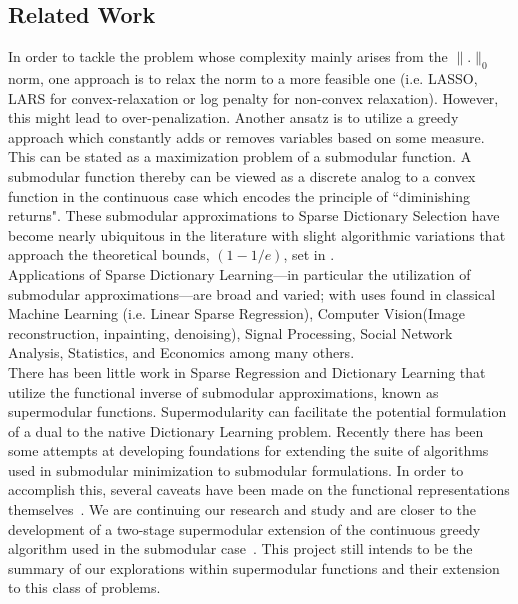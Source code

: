 \documentclass{article}
\begin{document}
\subsection{Related Work}
In order to tackle the problem whose complexity mainly arises from the $\| .\|_0$ norm, one approach is to relax the norm to a more feasible one (i.e. LASSO, LARS for convex-relaxation or log penalty for non-convex relaxation). However, this might lead to over-penalization\cite{nonconvexrelax}. Another ansatz is to utilize a greedy approach which constantly adds or removes variables based on some measure\cite{submod_spectral}.  This can be stated as a maximization problem of a submodular function. A submodular function thereby can be viewed as a discrete analog to a convex function in the continuous case\cite{submod_sparsecoding} which encodes the principle of ``diminishing returns". These submodular approximations to Sparse Dictionary Selection have become nearly ubiquitous in the literature with slight algorithmic variations that approach the theoretical bounds, $(1 - 1/e)$, set in \cite{Krause05near-optimalnonmyopic}.
\\

\noindent Applications of Sparse Dictionary Learning---in particular the utilization of submodular approximations---are broad and varied; with uses found in classical Machine Learning (i.e. Linear Sparse Regression), Computer Vision(Image reconstruction, inpainting, denoising), Signal Processing\cite{nonconvexrelax}\cite{submod_sparsecoding}, Social Network Analysis, Statistics\cite{rIBP}, and Economics\cite{utilityWelfare} among many others. 
\\

\noindent There has been little work in Sparse Regression and Dictionary Learning that utilize the functional inverse of submodular approximations, known as supermodular functions. Supermodularity can facilitate the potential formulation of a dual to the native Dictionary Learning problem. Recently there has been some attempts at developing foundations for extending the suite of algorithms used in submodular minimization to submodular formulations. In order to accomplish this, several caveats have been made on the functional representations themselves~\cite{BoutsidisLS15}. We are continuing our research and study and are closer to the development of a two-stage supermodular extension of the continuous greedy algorithm used in the submodular case~\cite{Singer16TwoStage}. This project still intends to be the summary of our explorations within supermodular functions and their extension to this class of problems.
\end{document}
